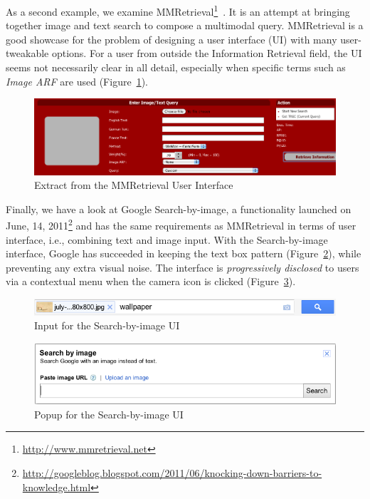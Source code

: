 \documentclass[runningheads,a4paper]{llncs} \usepackage[utf8]{inputenc}
\begin{document}
As a second example, we examine MMRetrieval\footnote{\url{http://www.mmretrieval.net}}~\cite{mmretrieval}. It is an attempt at bringing together image and text search to compose a multimodal query. MMRetrieval is a good showcase for the problem of designing a user interface (UI) with many user-tweakable options. For a user from outside the Information Retrieval field, the UI seems not necessarily clear in all detail, especially when specific terms such as \emph{Image ARF} are used (Figure~\ref{fig:mmretrieval-ui}).

\begin{figure}[h!]
  \centering
    \includegraphics[width=0.8\linewidth]{resources/mmretrieval-UI.png}
  \caption{Extract from the MMRetrieval User Interface}
  \label{fig:mmretrieval-ui}
\end{figure}

Finally, we have a look at Google Search-by-image, a functionality launched on June, 14, 2011\footnote{\url{http://googleblog.blogspot.com/2011/06/knocking-down-barriers-to-knowledge.html}} and has the same requirements as MMRetrieval in terms of user interface, i.e., combining text and image input. With the Search-by-image interface, Google has succeeded in keeping the text box pattern (Figure~\ref{fig:search-by-image-box}), while preventing any extra visual noise. The interface is \emph{progressively disclosed} to users via a contextual menu when the camera icon is clicked (Figure~\ref{fig:search-by-image-popup}).

\begin{figure}[h!]
  \centering
    \includegraphics[width=0.8\linewidth]{resources/search-by-image-UI-box.png}
  \caption{Input for the Search-by-image UI}
  \label{fig:search-by-image-box}
\end{figure}

\begin{figure}[h!]
  \centering
    \includegraphics[width=0.8\linewidth]{resources/search-by-image-UI-popup.png}
  \caption{Popup for the Search-by-image UI}
  \label{fig:search-by-image-popup}
\end{figure}
\end{document}
